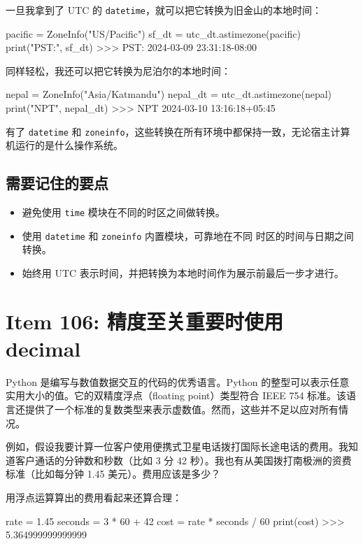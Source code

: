 一旦我拿到了 UTC 的 \texttt{datetime}，就可以把它转换为旧金山的本地时间：

\begin{codebox}[python]
pacific = ZoneInfo("US/Pacific")
sf_dt = utc_dt.astimezone(pacific)
print("PST:", sf_dt)
>>>
PST: 2024-03-09 23:31:18-08:00
\end{codebox}

同样轻松，我还可以把它转换为尼泊尔的本地时间：

\begin{codebox}[python]
nepal = ZoneInfo("Asia/Katmandu")
nepal_dt = utc_dt.astimezone(nepal)
print("NPT", nepal_dt)
>>>
NPT 2024-03-10 13:16:18+05:45
\end{codebox}

有了 \texttt{datetime} 和 \texttt{zoneinfo}，这些转换在所有环境中都保持一致，无论宿主计算机运行的是什么操作系统。

\subsection{需要记住的要点}

\begin{itemize}
\item 避免使用 \texttt{time} 模块在不同的时区之间做转换。
\item 使用 \texttt{datetime} 和 \texttt{zoneinfo} 内置模块，可靠地在不同 时区的时间与日期之间转换。
\item 始终用 UTC 表示时间，并把转换为本地时间作为展示前最后一步才进行。
\end{itemize}

\section{Item 106: 精度至关重要时使用 decimal}

Python 是编写与数值数据交互的代码的优秀语言。Python 的整型可以表示任意实用大小的值。它的双精度浮点（floating point）类型符合 IEEE 754 标准。该语言还提供了一个标准的复数类型来表示虚数值。然而，这些并不足以应对所有情况。

例如，假设我要计算一位客户使用便携式卫星电话拨打国际长途电话的费用。我知道客户通话的分钟数和秒数（比如 3 分 42 秒）。我也有从美国拨打南极洲的资费标准（比如每分钟 1.45 美元）。费用应该是多少？

用浮点运算算出的费用看起来还算合理：

\begin{codebox}[python]
rate = 1.45
seconds = 3 * 60 + 42
cost = rate * seconds / 60
print(cost)
>>>
5.364999999999999
\end{codebox}

